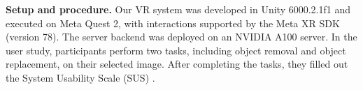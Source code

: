 \documentclass[runningheads]{llncs}
\begin{document}
\textbf{Setup and procedure. }
Our VR system was developed in Unity 6000.2.1f1 and executed on Meta Quest 2, with interactions supported by the Meta XR SDK (version 78). The server backend was deployed on an NVIDIA A100 server. In the user study, participants perform two tasks, including object removal and object replacement, on their selected image. After completing the tasks, they filled out the System Usability Scale (SUS) \cite{SUS}.





\end{document}
